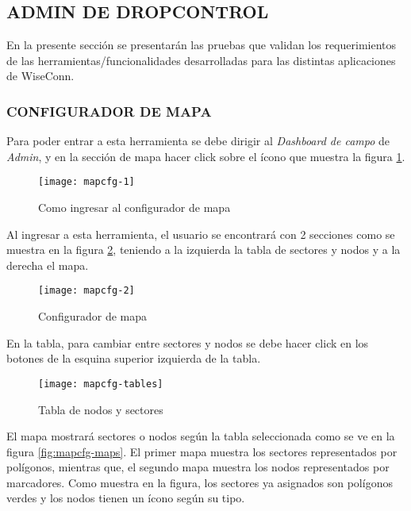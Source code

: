 
\subsection{ADMIN DE DROPCONTROL}

En la presente sección se presentarán las pruebas que validan los requerimientos de las herramientas/funcionalidades desarrolladas para las distintas aplicaciones de WiseConn.

\subsubsection{CONFIGURADOR DE MAPA}


Para poder entrar a esta herramienta se debe dirigir al \textit{Dashboard de campo} de \textit{Admin}, y en la sección de mapa hacer click sobre el ícono que muestra la figura \ref{fig:mapcfg-1}.

\begin{figure}[H]
	\centering
	\texttt{[image: mapcfg-1]}
	\caption{\label{fig:mapcfg-1} Como ingresar al configurador de mapa}
\end{figure}

Al ingresar a esta herramienta, el usuario se encontrará con 2 secciones como se muestra en la figura \ref{fig:mapcfg-2}, teniendo a la izquierda la tabla de sectores y nodos y a la derecha el mapa.

\begin{figure}[H]
	\centering
	\texttt{[image: mapcfg-2]}
	\caption{\label{fig:mapcfg-2} Configurador de mapa}
\end{figure}

En la tabla, para cambiar entre sectores y nodos se debe hacer click en los botones de la esquina superior izquierda de la tabla.

\begin{figure}[H]
	\centering
	\texttt{[image: mapcfg-tables]}
	\caption{\label{fig:mapcfg-tables} Tabla de nodos y sectores}
\end{figure}

El mapa mostrará sectores o nodos según la tabla seleccionada como se ve en la figura \ref{fig:mapcfg-maps}. El primer mapa muestra los sectores representados por polígonos, mientras que, el segundo mapa muestra los nodos representados por marcadores. Como muestra en la figura, los sectores ya asignados son polígonos verdes y los nodos tienen un ícono según su tipo.

